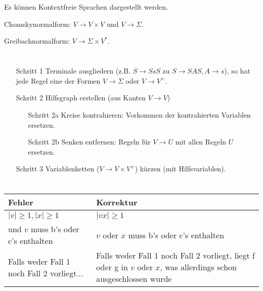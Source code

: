 \documentclass{article}
\begin{document}
\section{}
Es können Kontextfreie Sprachen dargestellt werden.

Chomskynormalform: $V \rightarrow V \times V$ und $V \rightarrow \Sigma$.

Greibachnormalform: $V \rightarrow \Sigma \times V^*$.



\section{}
\begin{enumerate}
	\item[Schritt 1] Terminale ausgliedern (z.B. $S \rightarrow SsS$ zu $S \rightarrow SAS, A \rightarrow s$), so hat jede Regel eine der Formen $V\rightarrow \Sigma$ oder $V\rightarrow V^+$.
  \item[Schritt 2] Hilfsgraph erstellen (aus Kanten $V \rightarrow V$)
  \begin{enumerate}
    \item[Schritt 2a] Kreise kontrahieren: Vorkommen der kontrahierten Variablen ersetzen.
    \item[Schritt 2b] Senken entfernen: Regeln für $V\rightarrow U$ mit allen Regeln $U$ ersetzen.
  \end{enumerate}
  \item[Schritt 3] Variablenketten ($V \rightarrow V \times V^+$) kürzen (mit Hilfsvariablen).
\end{enumerate}

\section{}
\begin{tabularx}{\textwidth}{X|X}
Fehler & Korrektur \\
\hline
$|v|\geq 1, |x| \geq 1$ & $|vx| \geq 1$\\
und $v$ muss b's oder c's enthalten & $v$ oder $x$ muss b's oder c's enthalten\\
Falls weder Fall 1 noch Fall 2 vorliegt... & Falls weder Fall 1 noch Fall 2 vorliegt, liegt f oder g in $v$ oder $x$, was allerdings schon ausgeschlossen wurde
\end{tabularx}
\end{document}
